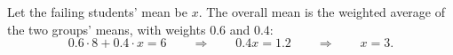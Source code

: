 Let the failing students' mean be $x$. The overall mean is the weighted average of the two groups' means, with weights $0.6$ and $0.4$:
\[
0.6\cdot8+0.4\cdot x=6\qquad\Longrightarrow\qquad 0.4x=1.2\qquad\Longrightarrow\qquad x=\boxed{3}.
\]
